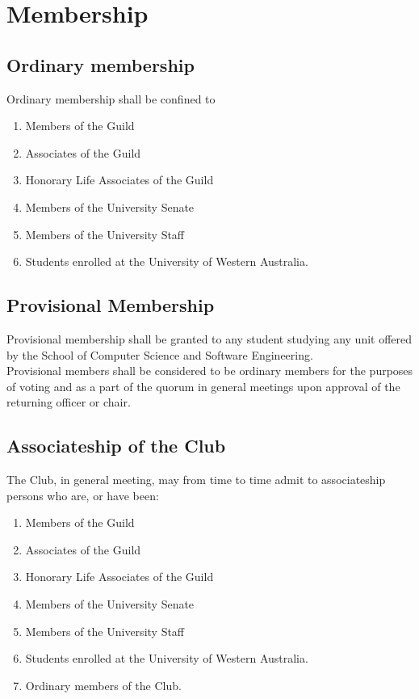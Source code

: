 \documentclass[10pt,a4paper]{report}
\begin{document}
	\section{Membership}
		\subsection{Ordinary membership}
			Ordinary membership shall be confined to
			\begin{enumerate}[label=\alph*]
				\item Members of the Guild
				\item Associates of the Guild
				\item Honorary Life Associates of the Guild
				\item Members of the University Senate
				\item Members of the University Staff
				\item Students enrolled at the University of Western Australia. 
			\end{enumerate}
		
		\subsection{Provisional Membership}
			Provisional membership shall be granted to any student studying any unit offered by the School of Computer Science and Software Engineering. \\
			Provisional members shall be considered to be ordinary members for the purposes of voting and as a part of the quorum in general meetings upon approval of the returning officer or chair.
			
		\subsection{Associateship of the Club}
			The Club, in general meeting, may from time to time admit to associateship persons who are, or have been:
			\begin{enumerate}[label=\alph*]
				\item Members of the Guild
				\item Associates of the Guild
				\item Honorary Life Associates of the Guild
				\item Members of the University Senate
				\item Members of the University Staff
				\item Students enrolled at the University of Western Australia.
				\item Ordinary members of the Club.
			\end{enumerate}
\end{document}

